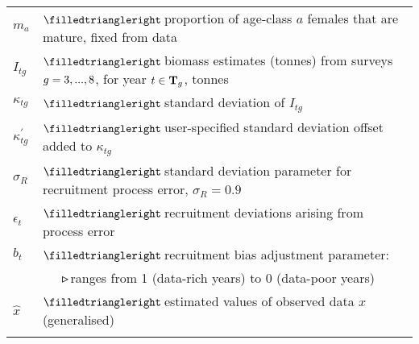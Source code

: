 \documentclass[11pt]{book}
\newcommand{\mbull}{$\filledtriangleright$\,}
\newcommand{\nbull}{~~~$\smalltriangleright$\,}
\begin{document}
\begin{longtable}{L{1.00in}L{5.5in}}
$m_a$                 & \mbull proportion of age-class $a$ females that are mature, fixed from data\\
$I_{tg}$              & \mbull biomass estimates (tonnes) from surveys $g = 3,...,8$, for year $t \in {\bf T}_g$, tonnes\\
$\kappa_{tg}$         & \mbull standard deviation of $I_{tg}$\\
$\kappa_{tg}^\prime$  & \mbull user-specified standard deviation offset added to $\kappa_{tg}$\\
$\sigma_R$            & \mbull standard deviation parameter for recruitment process error, $\sigma_R = 0.9$\\
$\epsilon_t$          & \mbull recruitment deviations arising from process error\\
$b_t$                 & \mbull recruitment bias adjustment parameter:\\
                      & \nbull ranges from 1 (data-rich years) to 0 (data-poor years)\\
$\widehat{x}$       & \mbull estimated values of observed data $x$ (generalised)\\
\\[-.5ex]


\end{longtable}
\end{document}
